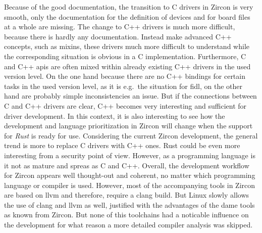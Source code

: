 Because of the good documentation, the transition to C drivers in Zircon is very smooth, only the documentation for the definition of devices and for board files at a whole are missing.
The change to C++ drivers is much more difficult, because there is hardly any documentation.
Instead make advanced C++ concepts, such as mixins, these drivers much more difficult to understand while the corresponding situation is obvious in a C implementation.
Furthermore, C and C++ \acp{api} are often mixed within already existing C++ drivers in the used version level.
On the one hand because there are no C++ bindings for certain tasks in the used version level, as it is e.g.\ the situation for \ac{fidl}, on the other hand are probably simple inconsistencies an issue.
But if the connections between C and C++ drivers are clear, C++ becomes very interesting and sufficient for driver development.
In this context, it is also interesting to see how the development and language prioritization in Zircon will change when the support for \textit{Rust} is ready for use.
Considering the current Zircon development, the general trend is more to replace C drivers with C++ ones.
Rust could be even more interesting from a security point of view.
However, as a programming language is it not as mature and spreas as C and C++.
Overall, the development workflow for Zircon appears well thought-out and coherent, no matter which programming language or compiler is used.
However, most of the accompanying tools in Zircon are based on \ac{llvm} and therefore, require a clang build.
But Linux slowly allows the use of clang and \ac{llvm} as well, justified with the advantages of the dame tools as known from Zircon.
But none of this toolchains had a noticable influence on the development for what reason a more detailed compiler analysis was skipped.

